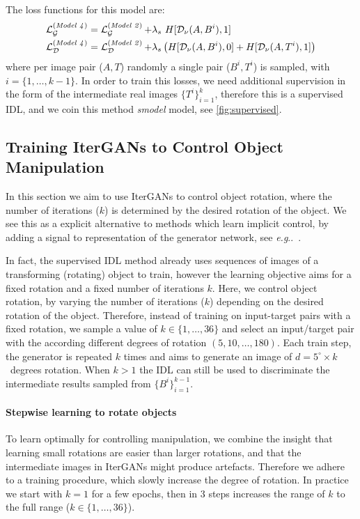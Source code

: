 \documentclass[runningheads]{llncs}
\makeatletter
\DeclareRobustCommand\onedot{\futurelet\@let@token\@onedot}
\def\@onedot{\ifx\@let@token.\else.\null\fi\xspace}
\def\eg{\emph{e.g}\onedot} \def\Eg{\emph{E.g}\onedot}
\newcommand{\myparagraph}[1]{\vspace{-2mm}\paragraph{\textbf{#1}}}
\let\wip\emph
\makeatother
\begin{document}
The loss functions for this model are:
\begin{align}
    \LL_\Gen^{(\text{\wip{Model 4}})} &= \LL_\Gen^{(\text{\wip{Model 2}})} + \lambda_s \ H[\Dis_\nu(A,B^i), 1] \label{eq:mm-lgen-m4}\\
    \LL_\Dis^{(\text{\wip{Model 4}})} &= \LL_\Dis^{(\text{\wip{Model 2}})} + \lambda_s \left( H[\Dis_\nu(A,B^i), 0] + H[\Dis_\nu(A,T^i), 1] \right)\label{eq:mm-ldis-m4}
\end{align}
where per image pair ($A, T$) randomly a single pair ($B^i,T^i$) is sampled, with $i= \{1,\ldots,k-1\}$.
In order to train this losses, we need additional supervision in the form of the intermediate real images $\{T^i\}_{i=1}^k$, therefore this is a supervised IDL, and we coin this method \wip{smodel} model, see \autoref{fig:supervised}.

\subsection{Training IterGANs to Control Object Manipulation}\label{sec:stepwise}
In this section we aim to use IterGANs to control object rotation, where the number of iterations ($k$) is determined by the desired rotation of the object.
We see this as a explicit alternative to methods which learn implicit control, by adding a signal to representation of the generator network, see \eg~\cite{park17cvpr}. 

In fact, the supervised IDL method already uses sequences of images of a transforming (rotating) object to train, however the learning objective aims for a fixed rotation and a fixed number of iterations $k$.
Here, we control object rotation, by varying the number of iterations ($k$) depending on the desired rotation of the object.
Therefore, instead of training on input-target pairs with a fixed rotation, we sample a value of $k \in \{1,\ldots,36\}$ and select an input/target pair with the according different degrees of rotation $(5,10,\ldots,180)$.
Each train step, the generator is repeated $k$ times and aims to generate an image of $d=5^\circ\times k$~degrees rotation.
When $k>1$ the IDL can still be used to discriminate the intermediate results sampled from $\{B^i\}_{i=1}^{k-1}$.

\myparagraph{Stepwise learning to rotate objects}
To learn optimally for controlling manipulation, we combine the insight that learning small rotations are easier than larger rotations, and that the intermediate images in IterGANs might produce artefacts.
Therefore we adhere to a training procedure, which slowly increase the degree of rotation. In practice we start with $k=1$ for a few epochs, then in 3 steps increases the range of $k$ to the full range ($k \in \{1,\ldots,36\}$).
\end{document}
